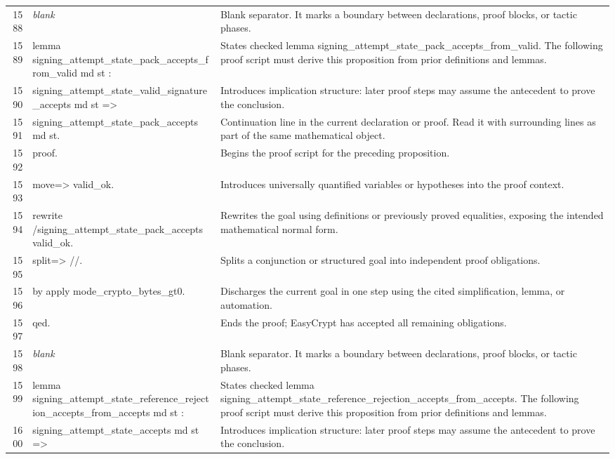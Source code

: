 \documentclass[10pt]{article}
\begin{document}
\begin{longtable}{r L{0.53\textwidth} L{0.37\textwidth}}
1588 & {\ttfamily\scriptsize \emph{blank}} & Blank separator.  It marks a boundary between declarations, proof blocks, or tactic phases. \\
1589 & {\ttfamily\scriptsize lemma signing\_attempt\_state\_pack\_accepts\_from\_valid md st :} & States checked lemma signing\_attempt\_state\_pack\_accepts\_from\_valid.  The following proof script must derive this proposition from prior definitions and lemmas. \\
1590 & {\ttfamily\scriptsize   signing\_attempt\_state\_valid\_signature\_accepts md st =>} & Introduces implication structure: later proof steps may assume the antecedent to prove the conclusion. \\
1591 & {\ttfamily\scriptsize   signing\_attempt\_state\_pack\_accepts md st.} & Continuation line in the current declaration or proof.  Read it with surrounding lines as part of the same mathematical object. \\
1592 & {\ttfamily\scriptsize proof.} & Begins the proof script for the preceding proposition. \\
1593 & {\ttfamily\scriptsize move=> valid\_ok.} & Introduces universally quantified variables or hypotheses into the proof context. \\
1594 & {\ttfamily\scriptsize rewrite /signing\_attempt\_state\_pack\_accepts valid\_ok.} & Rewrites the goal using definitions or previously proved equalities, exposing the intended mathematical normal form. \\
1595 & {\ttfamily\scriptsize split=> //.} & Splits a conjunction or structured goal into independent proof obligations. \\
1596 & {\ttfamily\scriptsize by apply mode\_crypto\_bytes\_gt0.} & Discharges the current goal in one step using the cited simplification, lemma, or automation. \\
1597 & {\ttfamily\scriptsize qed.} & Ends the proof; EasyCrypt has accepted all remaining obligations. \\
1598 & {\ttfamily\scriptsize \emph{blank}} & Blank separator.  It marks a boundary between declarations, proof blocks, or tactic phases. \\
1599 & {\ttfamily\scriptsize lemma signing\_attempt\_state\_reference\_rejection\_accepts\_from\_accepts md st :} & States checked lemma signing\_attempt\_state\_reference\_rejection\_accepts\_from\_accepts.  The following proof script must derive this proposition from prior definitions and lemmas. \\
1600 & {\ttfamily\scriptsize   signing\_attempt\_state\_accepts md st =>} & Introduces implication structure: later proof steps may assume the antecedent to prove the conclusion. \\

\end{longtable}
\end{document}
